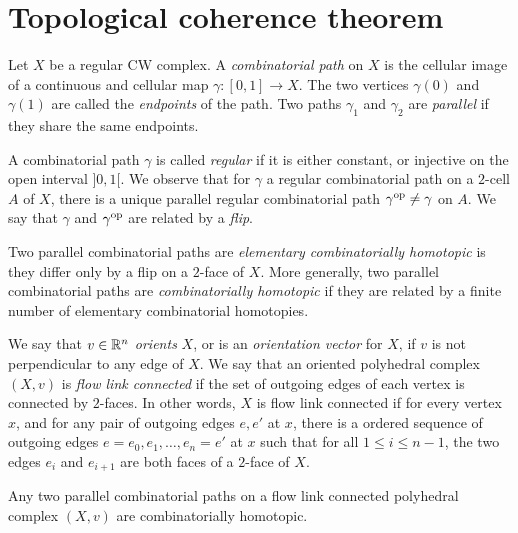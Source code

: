 
\section{Topological coherence theorem} 
\label{s:polycoherence}

Let $X$ be a regular CW complex. 
A \emph{combinatorial path} on $X$ is the cellular image of a continuous and cellular map $\gamma : [0,1] \to X$. 
The two vertices $\gamma(0)$ and $\gamma(1)$ are called the \emph{endpoints} of the path. 
Two paths $\gamma_1$ and $\gamma_2$ are \emph{parallel} if they share the same endpoints. 

A combinatorial path $\gamma$ is called \emph{regular} if it is either constant, or injective on the open interval $]0,1[$.
We observe that for $\gamma$ a regular combinatorial path on a $2$-cell $A$ of $X$, there is a unique parallel regular combinatorial path $\gamma^{\mathrm{op}}\neq \gamma$ on $A$. 
We say that $\gamma$ and $\gamma^{\mathrm{op}}$ are related by a \emph{flip}.

\begin{definition}
    Two parallel combinatorial paths are \emph{elementary combinatorially homotopic} is they differ only by a flip on a $2$-face of $X$. 
    More generally, two parallel combinatorial paths are \emph{combinatorially homotopic} if they are related by a finite number of elementary combinatorial homotopies.
\end{definition}

We say that $v \in \mathbb R^n$ \emph{orients} $X$, or is an \emph{orientation vector} for $X$, if $v$ is not perpendicular to any edge of $X$.
We say that an oriented polyhedral complex $(X,v)$ is \emph{flow link connected} if the set of outgoing edges of each vertex is connected by $2$-faces. 
In other words, $X$ is flow link connected if for every vertex $x$, and for any pair of outgoing edges $e, e'$ at $x$, there is a ordered sequence of outgoing edges $e=e_0, e_1, \ldots, e_n=e'$ at $x$ such that for all $1\leq i \leq n-1$, the two edges $e_i$ and $e_{i+1}$ are both faces of a $2$-face of $X$.  

\begin{thm}
    \label{t:polytopal-coherence}
    Any two parallel combinatorial paths on a flow link connected polyhedral complex $(X,v)$ are combinatorially homotopic. 
\end{thm}

